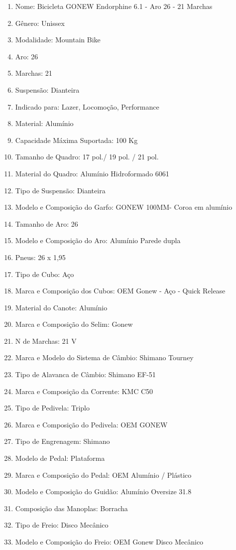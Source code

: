 \begin{itemize}
\begin{itemize}
		\begin{enumerate}
		\item Nome:  Bicicleta GONEW Endorphine 6.1 - Aro 26 - 21 Marchas
		\item Gênero:  Unissex
		\item Modalidade: Mountain Bike
		\item Aro: 26
 		\item Marchas: 21
		\item Suspensão: Dianteira
		\item Indicado para: Lazer, Locomoção, Performance
		\item Material: Alumínio
		\item Capacidade Máxima Suportada: 100 Kg
		\item Tamanho de Quadro: 17 pol./ 19 pol. / 21 pol.
		\item Material do Quadro: Alumínio Hidroformado 6061
		\item Tipo de Suspensão: Dianteira
		\item Modelo e Composição do Garfo: GONEW 100MM- Coroa em alumínio
		\item Tamanho de Aro: 26
		\item Modelo e Composição do Aro: Alumínio Parede dupla
		\item Pneus: 26 x 1,95
		\item Tipo de Cubo: Aço
		\item Marca e Composição dos Cubos: OEM Gonew - Aço - Quick Release
		\item Material do Canote: Alumínio
		\item Marca e Composição do Selim: Gonew
		\item N de Marchas: 21 V
		\item Marca e Modelo do Sistema de Câmbio: Shimano Tourney
		\item Tipo de Alavanca de Câmbio: Shimano EF-51
		\item Marca e Composição da Corrente: KMC C50
		\item Tipo de Pedivela: Triplo
		\item Marca e Composição do Pedivela: OEM GONEW
		\item Tipo de Engrenagem: Shimano
		\item Modelo de Pedal: Plataforma
		\item Marca e Composição do Pedal: OEM Alumínio / Plástico
		\item Modelo e Composição do Guidão: Alumínio Oversize 31.8
		\item Composição das Manoplas: Borracha
		\item Tipo de Freio: Disco Mecânico
 		\item Modelo e Composição do Freio: OEM Gonew Disco Mecânico
		\end{enumerate}
	\end{itemize}
\end{itemize}

